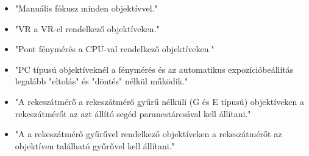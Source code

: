 \begin{itemize}
    \item "Manuális fókusz minden objektívvel."\cite{Nikon_D6_referencia_használati_utasítás}
    \item "VR a VR-el rendelkező objektíveken."\cite{Nikon_D6_referencia_használati_utasítás}
    \item "Pont fénymérés a CPU-val rendelkező objektíveken."\cite{Nikon_D6_referencia_használati_utasítás}
    \item "PC típusú objektíveknél a fénymérés és az automatikus expozícióbeállítás legalább "eltolás" és "döntés" nélkül működik."\cite{Nikon_D6_referencia_használati_utasítás}
    \item "A rekeszátmérő a rekeszátmérő gyűrű nélküli (G és E típusú) objektíveken a rekeszátmérőt az azt állító segéd parancstárcsával kell állítani."\cite{Nikon_D6_referencia_használati_utasítás_aperture}
    \item "A a rekeszátmérő gyűrűvel rendelkező objektíveken a rekeszátmérőt az objektíven található gyűrűvel kell állítani."\cite{Nikon_D6_referencia_használati_utasítás_aperture}
    
\end{itemize}

\clearpage

